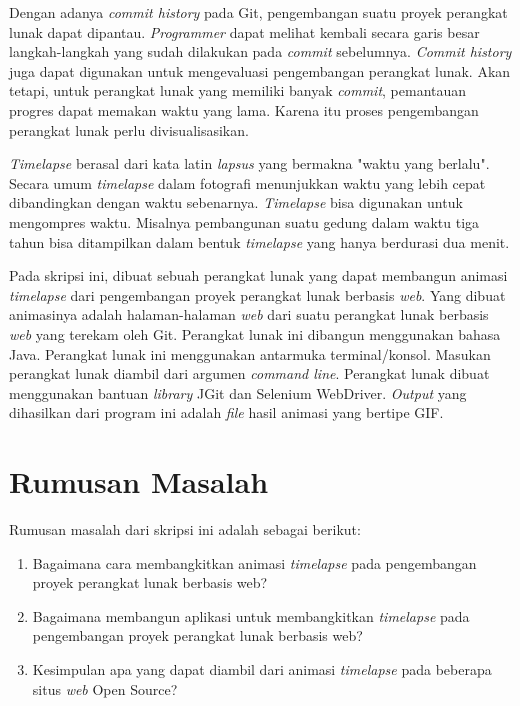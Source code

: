 Dengan adanya \textit{commit history} pada Git, pengembangan suatu proyek perangkat lunak dapat dipantau. \textit{Programmer} dapat melihat kembali secara garis besar langkah-langkah yang sudah dilakukan pada \textit{commit} sebelumnya. \textit{Commit history} juga dapat digunakan untuk mengevaluasi pengembangan perangkat lunak. Akan tetapi, untuk perangkat lunak yang memiliki banyak \textit{commit}, pemantauan progres dapat memakan waktu yang lama. Karena itu proses pengembangan perangkat lunak perlu divisualisasikan. 
  
\textit{Timelapse} berasal dari kata latin \textit{lapsus} yang bermakna "waktu yang berlalu"\cite{higgins2016time}. Secara umum \textit{timelapse} dalam fotografi menunjukkan waktu yang lebih cepat dibandingkan dengan waktu sebenarnya. \textit{Timelapse} bisa digunakan untuk mengompres waktu. Misalnya pembangunan suatu gedung dalam waktu tiga tahun bisa ditampilkan dalam bentuk \textit{timelapse} yang hanya berdurasi dua menit.   
  
Pada skripsi ini, dibuat sebuah perangkat lunak yang dapat membangun animasi \textit{timelapse} dari pengembangan proyek perangkat lunak berbasis \textit{web}. Yang dibuat animasinya adalah halaman-halaman  \textit{web} dari suatu perangkat lunak berbasis \textit{web} yang terekam oleh Git. Perangkat lunak ini dibangun menggunakan bahasa Java. Perangkat lunak ini menggunakan antarmuka terminal/konsol. Masukan perangkat lunak diambil dari argumen \textit{command line}. Perangkat lunak dibuat menggunakan bantuan \textit{library} JGit dan Selenium WebDriver. \textit{Output} yang dihasilkan dari program ini adalah \textit{file} hasil animasi yang bertipe GIF.

\section{Rumusan Masalah}
\label{sec:rumusan}
Rumusan masalah dari skripsi ini adalah sebagai berikut:
\begin{enumerate}
	\item Bagaimana cara membangkitkan animasi \textit{timelapse} pada pengembangan proyek perangkat lunak berbasis web?
	\item Bagaimana membangun aplikasi untuk membangkitkan \textit{timelapse} pada pengembangan proyek perangkat lunak berbasis web?
	\item Kesimpulan apa yang dapat diambil dari animasi \textit{timelapse} pada beberapa situs \textit{web} Open Source?	
\end{enumerate}

